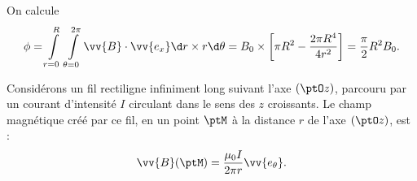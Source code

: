
\begin{corrige}
On calcule \vspace{-4mm}
\[
\phi=\int\limits_{r=0}^R \, \int\limits_{\theta=0}^{2 \pi} \vv{B}\cdot\vv{e_x} \d r \times r \d \theta
=B_0 \times \left[ \pi R^{2}-\dfrac{2 \pi R^4}{4r^2} \right]
=\dfrac{\pi}{2}  R^2 B_0.
\]  
\end{corrige}


\finEntrainement


\newpage



\hauteurLargeurCadreReponse		{8mm}{4cm}
\initialisationEntrainement


\debutEntrainement

                                \initialisationPartieGauche %
Considérons un fil rectiligne infiniment long suivant l'axe $(\ptO z)$, parcouru par un courant d'intensité $I$ circulant dans le sens des
$z$ croissants. Le champ magnétique créé par ce fil, en un point $\ptM$ à la distance $r$ de l'axe $(\ptO z)$, est : 
\[
\vv{B}(\ptM)=\dfrac{\mu_{0}I}{2\pi r} \vv{e_\theta}.
\]
%

